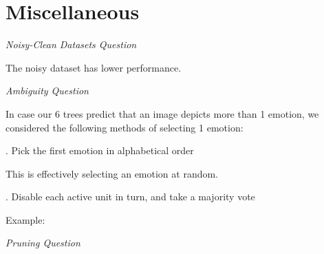 \documentclass[12pt, a4paper, portrait]{article}
\begin{document}
\section*{Miscellaneous}

\textit{Noisy-Clean Datasets Question}\par
\bigskip
The noisy dataset has lower performance.\par
\bigskip

\textit{Ambiguity Question}\par
\bigskip
In case our 6 trees predict that an image depicts more than 1 emotion, we considered the following methods of selecting 1 emotion:\par
{}. Pick the first emotion in alphabetical order\par
This is effectively selecting an emotion at random.\par
{}. Disable each active unit in turn, and take a majority vote\par
Example:\par
\bigskip

\textit{Pruning Question}\par
\bigskip
\end{document}
